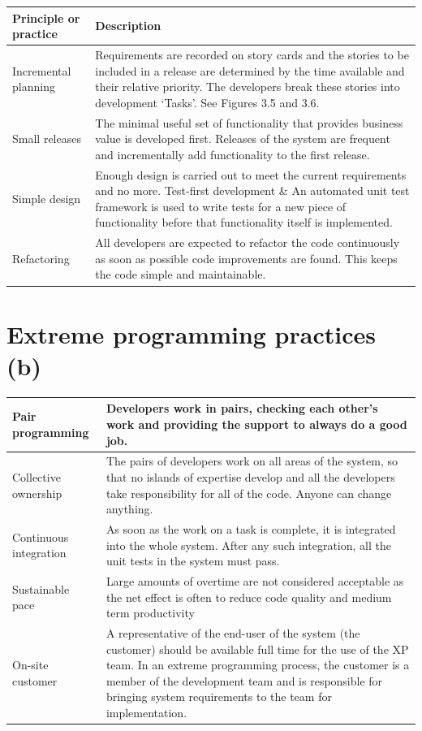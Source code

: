 \begin{table}[h!]
\centering
\begin{tabular}{ |p{3cm}|p{8cm}|  }
\hline
Principle or practice & Description  \\
\hline
\hline
Incremental planning & Requirements are recorded on story cards and the stories to be included in a release are determined by the time available and their relative priority. The developers break these stories into development ‘Tasks’. See Figures 3.5 and 3.6.\\
\hline
Small releases & The minimal useful set of functionality that provides business value is developed first. Releases of the system are frequent and incrementally add functionality to the first release.\\
\hline
Simple design & Enough design is carried out to meet the current requirements and no more. Test-first development \& An automated unit test framework is used to write tests for a new piece of functionality before that functionality itself is implemented.\\
\hline
Refactoring & All developers are expected to refactor the code continuously as soon as possible code improvements are found. This keeps the code simple and maintainable.\\
\hline
\end{tabular}

\label{table:T2_2}
\end{table}
\newpage
\section{ Extreme programming practices (b)}

\begin{table}[h!]
\centering
\begin{tabular}{ |p{3cm}|p{8cm}|  }
\hline
Pair programming & Developers work in pairs, checking each other’s work and providing the support to always do a good job.\\
\hline
Collective ownership & The pairs of developers work on all areas of the system, so that no islands of expertise develop and all the developers take responsibility for all of the code. Anyone can change anything.\\
\hline
Continuous integration & As soon as the work on a task is complete, it is integrated into the whole system. After any such integration, all the unit tests in the system must pass.\\
\hline
Sustainable pace & Large amounts of overtime are not considered acceptable as the net effect is often to reduce code quality and medium term productivity\\
\hline
On-site customer & A representative of the end-user of the system (the customer) should be available full time for the use of the XP team. In an extreme programming process, the customer is a member of the development team and is responsible for bringing system requirements to the team for implementation.\\
\hline
\end{tabular}

\label{table:T2_3}
\end{table}

